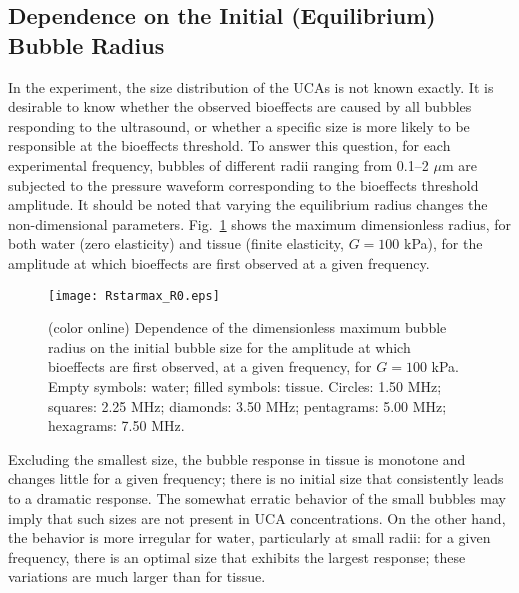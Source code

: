 \documentclass[%
preprint,%
author-year,%
]{jasatex}
\begin{document}
\begin{figure*}[t]
  \caption{(color online) Dependence of the bubble dynamics on the gas contents
  ($G=100$ kPa).}
  \label{fig:gascontents}
\end{figure*}






\subsection{Dependence on the Initial (Equilibrium) Bubble Radius}

In the experiment, the size distribution of the UCAs is not known
exactly. It is desirable to know whether the observed bioeffects are
caused by all bubbles responding to the ultrasound, or whether a
specific size is more likely to be responsible at the bioeffects
threshold. To answer this question, for each experimental frequency,
bubbles of different radii ranging from 0.1--2 $\mu$m are subjected to
the pressure waveform corresponding to the bioeffects threshold
amplitude. It should be noted that varying the equilibrium radius
changes the non-dimensional parameters. Fig.~\ref{fig:size} shows the maximum dimensionless
radius, for both water (zero elasticity) and tissue (finite
elasticity, $G=100$ kPa), for the amplitude at which bioeffects are
first observed at a given frequency.

\begin{figure}[t]
    \texttt{[image: Rstarmax\_R0.eps]}
    \caption{(color online) Dependence of the dimensionless maximum bubble radius on
      the initial bubble size for the amplitude at which bioeffects
      are first observed, at a given frequency, for $G=100$ kPa. Empty
      symbols: water; filled symbols: tissue. Circles: 1.50 MHz; squares:
      2.25 MHz; diamonds: 3.50 MHz; pentagrams: 5.00 MHz; hexagrams: 7.50 MHz.}
    \label{fig:size}
\end{figure}

Excluding the smallest size, the bubble response in tissue is monotone
and changes little for a given frequency; there is no initial size
that consistently leads to a dramatic response. The somewhat erratic
behavior of the small bubbles may imply that such sizes are not
present in UCA concentrations. On the other hand, the behavior is more
irregular for water, particularly at small radii: for a given
frequency, there is an optimal size that exhibits the largest
response; these variations are much larger than for tissue.  
\end{document}
